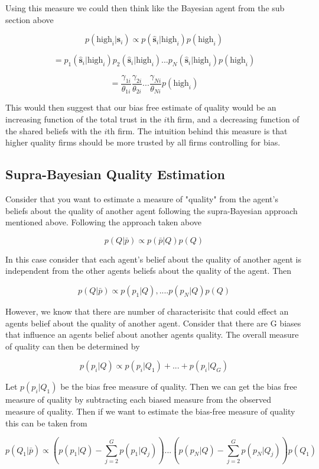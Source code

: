 \documentclass[a4paper]{article}
\begin{document}
Using this measure we could then think like the Bayesian agent from the sub section above

\[p(\text{high}_i|\hat{\textbf{s}}_i) \propto p(\hat{\textbf{s}}_i|\text{high}_i)p(\text{high}_i)\]

\[= p_1(\hat{\textbf{s}}_i|\text{high}_i)p_2(\hat{\textbf{s}}_i|\text{high}_i)...p_N(\hat{\textbf{s}}_i|\text{high}_i)p(\text{high}_i)\]

\[= \frac{\gamma_{1i}}{\theta_{1i}}\frac{\gamma_{2i}}{\theta_{2i}}...\frac{\gamma_{Ni}}{\theta_{Ni}}p(\text{high}_i)\]

This would then suggest that our bias free estimate of quality would be an increasing function of the total trust in the $i$th firm, and a decreasing function of the shared beliefs with the $i$th firm.  The intuition behind this measure is that higher quality firms should be more trusted by all firms controlling for bias.

\subsection{Supra-Bayesian Quality Estimation}

Consider that you want to estimate a measure of "quality" from the agent's beliefs about the quality of another agent following the supra-Bayesian approach mentioned above.  Following the approach taken above

\[p(Q | \bar{p}) \propto p(\bar{p} | Q) p(Q)\]

In this case consider that each agent's belief about the quality of another agent is independent from the other agents beliefs about the quality of the agent.  Then

\[p(Q | \bar{p}) \propto p(p_1 | Q), .... p(p_N | Q) p(Q)\]

However, we know that there are number of characterisitc that could effect an agents belief about the quality of another agent.  Consider that there are G biases that influence an agents belief about another agents quality.  The overall measure of quality can then be determined by

\[p(p_i | Q) \propto p(p_i | Q_1) + ... + p(p_i | Q_G)\]

Let $p(p_i | Q_1)$ be the bias free measure of quality.  Then we can get the bias free measure of quality by subtracting each biased measure from the observed measure of quality.  Then if we want to estimate the bias-free measure of quality this can be taken from

\[p(Q_1 | \bar{p}) \propto (p(p_1 | Q) - \sum_{j=2}^G p(p_1 | Q_j)) ... (p(p_N | Q) - \sum_{j=2}^G p(p_N | Q_j)) p(Q_1)\]
\end{document}
